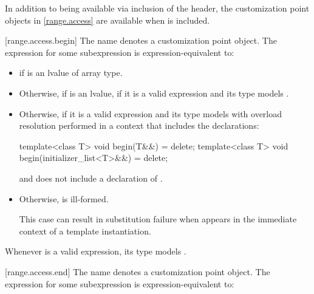 \pnum
In addition to being available via inclusion of the 
header, the customization point objects in \ref{range.access} are
available when  is included.

[range.access.begin]{}
\pnum
The name  denotes a customization point
object. The expression
 for some subexpression  is
expression-equivalent to:

\begin{itemize}
\item
   if  is an lvalue of array type.

\item
  Otherwise, if  is an lvalue,
  if it is a valid expression and its type  models .

\item
  Otherwise,  if it is a
  valid expression and its type  models  with overload
  resolution performed in a context that includes the declarations:
  \begin{codeblock}
  template<class T> void begin(T&&) = delete;
  template<class T> void begin(initializer_list<T>&&) = delete;
  \end{codeblock}

  and does not include a declaration of .

\item
  Otherwise,  is ill-formed.
  \begin{note}
  This case can result in substitution failure when 
  appears in the immediate context of a template instantiation.
  \end{note}
\end{itemize}

\pnum
\begin{note}
Whenever  is a valid expression, its type models
.
\end{note}

[range.access.end]{}
\pnum
The name  denotes a customization point
object. The expression
 for some subexpression  is
expression-equivalent to:

